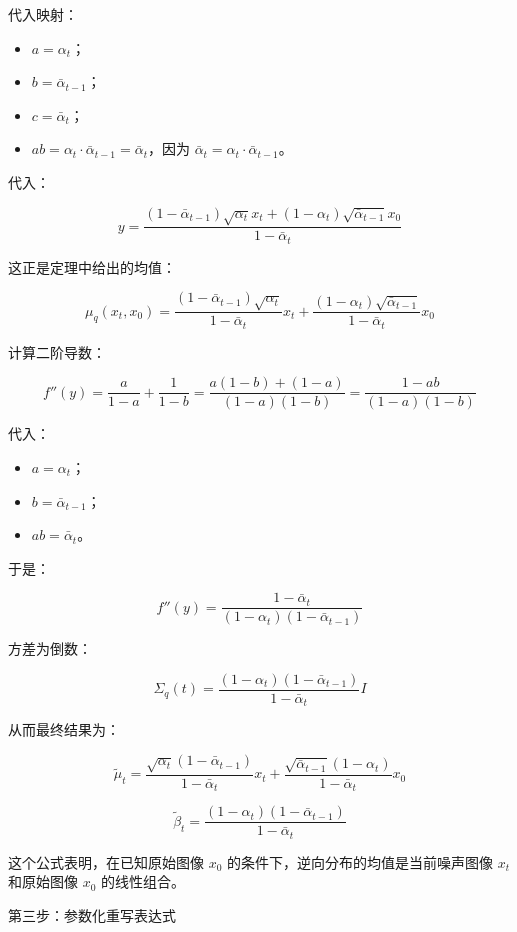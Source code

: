 代入映射：

\begin{itemize}
\tightlist
\item
  \(a=\alpha_t\)；
\item
  \(b=\bar{\alpha}_{t-1}\)；
\item
  \(c=\bar{\alpha}_t\)；
\item
  \(ab=\alpha_t\cdot\bar{\alpha}_{t-1}=\bar{\alpha}_t\)，因为 \(\bar{\alpha}_t=\alpha_t\cdot\bar{\alpha}_{t-1}\)。
\end{itemize}

代入：

\[
y=\frac{(1-\bar{\alpha}_{t-1})\sqrt{\alpha_t}x_t+(1-\alpha_t)\sqrt{\bar{\alpha}_{t-1}}x_0}{1-\bar{\alpha}_t}
\]

这正是定理中给出的均值：

\[
\mu_q(x_t,x_0)=
\frac{(1-\bar{\alpha}_{t-1})\sqrt{\alpha_t}}{1-\bar{\alpha}_t}x_t
+\frac{(1-\alpha_t)\sqrt{\bar{\alpha}_{t-1}}}{1-\bar{\alpha}_t}x_0
\]

计算二阶导数：

\[
f''(y)=\frac{a}{1-a}+\frac{1}{1-b}
=\frac{a(1-b)+(1-a)}{(1-a)(1-b)}
=\frac{1-ab}{(1-a)(1-b)}
\]

代入：

\begin{itemize}
\tightlist
\item
  \(a=\alpha_t\)；
\item
  \(b=\bar{\alpha}_{t-1}\)；
\item
  \(ab=\bar{\alpha}_t\)。
\end{itemize}

于是：

\[
f''(y)=\frac{1-\bar{\alpha}_t}{(1-\alpha_t)(1-\bar{\alpha}_{t-1})}
\]

方差为倒数：

\[
\Sigma_q(t)=\frac{(1-\alpha_t)(1-\bar{\alpha}_{t-1})}{1-\bar{\alpha}_t}I
\]

从而最终结果为：

\[
\tilde{\mu}_t=
\frac{\sqrt{\alpha_t}(1-\bar{\alpha}_{t-1})}{1-\bar{\alpha}_t}x_t
+\frac{\sqrt{\bar{\alpha}_{t-1}}(1-\alpha_t)}{1-\bar{\alpha}_t}x_0
\]

\[
\tilde{\beta}_t=\frac{(1-\alpha_t)(1-\bar{\alpha}_{t-1})}{1-\bar{\alpha}_t}
\]

这个公式表明，在已知原始图像 \(x_0\) 的条件下，逆向分布的均值是当前噪声图像 \(x_t\) 和原始图像 \(x_0\) 的线性组合。

第三步：参数化重写表达式

